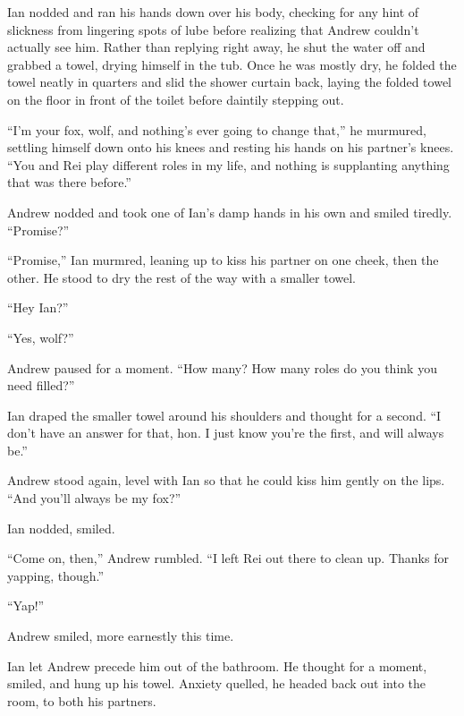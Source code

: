 Ian nodded and ran his hands down over his body, checking for any hint of slickness from lingering spots of lube before realizing that Andrew couldn't actually see him. Rather than replying right away, he shut the water off and grabbed a towel, drying himself in the tub. Once he was mostly dry, he folded the towel neatly in quarters and slid the shower curtain back, laying the folded towel on the floor in front of the toilet before daintily stepping out.

``I'm your fox, wolf, and nothing's ever going to change that,'' he murmured, settling himself down onto his knees and resting his hands on his partner's knees. ``You and Rei play different roles in my life, and nothing is supplanting anything that was there before.''

Andrew nodded and took one of Ian's damp hands in his own and smiled tiredly. ``Promise?''

``Promise,'' Ian murmred, leaning up to kiss his partner on one cheek, then the other. He stood to dry the rest of the way with a smaller towel.

``Hey Ian?''

``Yes, wolf?''

Andrew paused for a moment. ``How many? How many roles do you think you need filled?''

Ian draped the smaller towel around his shoulders and thought for a second. ``I don't have an answer for that, hon. I just know you're the first, and will always be.''

Andrew stood again, level with Ian so that he could kiss him gently on the lips. ``And you'll always be my fox?''

Ian nodded, smiled.

``Come on, then,'' Andrew rumbled. ``I left Rei out there to clean up. Thanks for yapping, though.''

``Yap!''

Andrew smiled, more earnestly this time.

Ian let Andrew precede him out of the bathroom. He thought for a moment, smiled, and hung up his towel. Anxiety quelled, he headed back out into the room, to both his partners.
